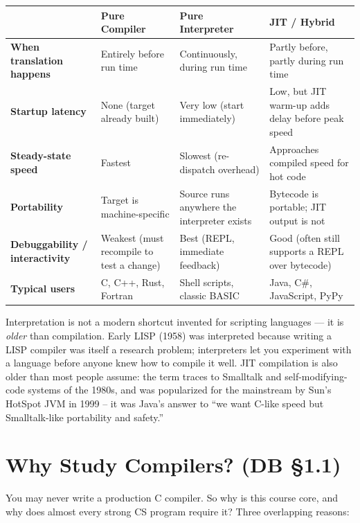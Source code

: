 \documentclass[11pt]{article}
\begin{document}
\begin{center}
\renewcommand{\arraystretch}{1.35}
\begin{tabularx}{\textwidth}{@{}l Y Y Y@{}}
\toprule
 & \textbf{Pure Compiler} & \textbf{Pure Interpreter} & \textbf{JIT / Hybrid} \\
\midrule
\textbf{When translation happens} & Entirely before run time & Continuously, during run time & Partly before, partly during run time \\
\textbf{Startup latency} & None (target already built) & Very low (start immediately) & Low, but JIT warm-up adds delay before peak speed \\
\textbf{Steady-state speed} & Fastest & Slowest (re-dispatch overhead) & Approaches compiled speed for hot code \\
\textbf{Portability} & Target is machine-specific & Source runs anywhere the interpreter exists & Bytecode is portable; JIT output is not \\
\textbf{Debuggability / interactivity} & Weakest (must recompile to test a change) & Best (REPL, immediate feedback) & Good (often still supports a REPL over bytecode) \\
\textbf{Typical users} & C, C++, Rust, Fortran & Shell scripts, classic BASIC & Java, C\#, JavaScript, PyPy \\
\bottomrule
\end{tabularx}
\end{center}

\begin{historynote}
Interpretation is not a modern shortcut invented for scripting languages --- it is \emph{older}
than compilation. Early LISP (1958) was interpreted because writing a LISP compiler was itself a
research problem; interpreters let you experiment with a language before anyone knew how to
compile it well. JIT compilation is also older than most people assume: the term traces to
Smalltalk and self-modifying-code systems of the 1980s, and was popularized for the mainstream by
Sun's HotSpot JVM in 1999 -- it was Java's answer to ``we want C-like speed but Smalltalk-like
portability and safety.''
\end{historynote}

\section{Why Study Compilers? (DB \S1.1)}

\dbtag You may never write a production C compiler. So why is this course core, and why does
almost every strong CS program require it? Three overlapping reasons:
\end{document}
